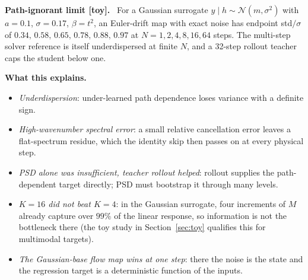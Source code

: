 \documentclass[11pt,a4paper]{article}
\newcommand{\N}{\mathcal{N}}
\newcommand{\status}[1]{\textsf{\small\color{black!60}[#1]}}
\newcommand{\head}[1]{\par\smallskip\noindent\textbf{#1}\ }
\begin{document}
\head{Path-ignorant limit \status{toy}.} For a Gaussian surrogate $y\mid h\sim\N(m,\sigma^2)$ with $a=0.1$, $\sigma=0.17$, $\beta=t^2$, an Euler-drift map with exact noise has endpoint std$/\sigma$ of $0.34,\,0.58,\,0.65,\,0.78,\,0.88,\,0.97$ at $N=1,2,4,8,16,64$ steps. The multi-step solver reference is itself underdispersed at finite $N$, and a 32-step rollout teacher caps the student below one.

\head{What this explains.}
\begin{itemize}
\item \emph{Underdispersion}: under-learned path dependence loses variance with a definite sign.
\item \emph{High-wavenumber spectral error}: a small relative cancellation error leaves a flat-spectrum residue, which the identity skip then passes on at every physical step.
\item \emph{PSD alone was insufficient, teacher rollout helped}: rollout supplies the path-dependent target directly; PSD must bootstrap it through many levels.
\item \emph{$K=16$ did not beat $K=4$}: in the Gaussian surrogate, four increments of $M$ already capture over $99\%$ of the linear response, so information is not the bottleneck there (the toy study in Section~\ref{sec:toy} qualifies this for multimodal targets).
\item \emph{The Gaussian-base flow map wins at one step}: there the noise is the state and the regression target is a deterministic function of the inputs.
\end{itemize}
\end{document}

